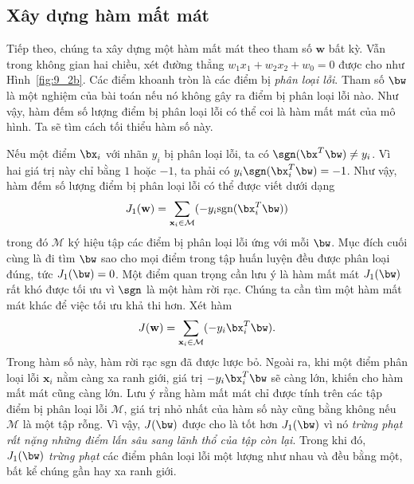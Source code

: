 
\subsection{Xây dựng hàm mất mát}
Tiếp theo, chúng ta xây dựng một hàm mất mát theo tham số $\mathbf{w}$ bất kỳ.
Vẫn trong không gian hai chiều, xét đường thẳng $w_1x_1 + w_2x_2 + w_0 = 0$ được
cho như Hình~\ref{fig:9_2b}. Các điểm khoanh tròn là các điểm bị \textit{phân
loại lỗi}. Tham số $\bw$ là một nghiệm của bài toán nếu nó không gây ra điểm bị phân loại lỗi nào. Như vậy, hàm đếm số lượng điểm bị phân loại lỗi có thể coi là hàm mất mát của mô hình. Ta sẽ tìm cách tối thiểu hàm số này.

Nếu một điểm $\bx_i$ với nhãn $y_i$ bị phân loại lỗi, ta có $\sgn(\bx^T\bw)
\neq y_i$. Vì hai giá trị này chỉ bằng $1$ hoặc $-1$, ta phải có
$y_i\sgn(\bx_i^T\bw) = -1$. Như vậy, hàm đếm số lượng điểm bị phân loại lỗi có
thể được viết dưới dạng
\begin{equation} 
    J_1(\mathbf{w}) = \sum_{\mathbf{x}_i \in \mathcal{M}} (-y_i\text{sgn}(\bx_i^T\bw)) 
\end{equation} 
trong đó $\mathcal{M}$ ký hiệu tập các điểm bị phân loại lỗi ứng với mỗi $\bw$. Mục đích cuối cùng là đi tìm $\bw$ sao cho mọi điểm trong tập huấn luyện đều được phân loại đúng, tức $J_1(\bw) = 0$. Một điểm quan trọng cần lưu ý là hàm mất mát $J_1(\bw)$ rất khó được tối ưu vì $\sgn$ là một hàm rời rạc. Chúng ta cần tìm một hàm mất mát khác để việc tối ưu khả thi hơn. 
Xét hàm 
\begin{equation} 
    J(\mathbf{w}) = \sum_{\mathbf{x}_i \in \mathcal{M}} (-y_i\bx_i^T\bw). 
\end{equation} 
Trong hàm số này, hàm rời rạc $\text{sgn}$ đã được lược bỏ. Ngoài ra, khi một
điểm phân loại lỗi $\mathbf{x}_i$ nằm càng xa ranh giới, giá trị
$-y_i\bx_i^T\bw$ sẽ càng lớn, khiến cho hàm mất mát cũng càng lớn. Lưu ý rằng
hàm mất mát chỉ được tính trên các tập điểm bị phân loại lỗi $\mathcal{M}$, giá
trị nhỏ nhất của hàm số này cũng bằng không nếu $\mathcal{M}$ là một tập rỗng.
Vì vậy, $J(\bw)$ được cho là tốt hơn $J_1(\bw)$ vì nó \textit{trừng phạt rất
nặng những điểm lấn sâu sang lãnh thổ của tập còn lại}. Trong khi đó,
$J_1(\bw)$ \textit{trừng phạt} các điểm phân loại lỗi một lượng như nhau và đều
bằng một, bất kể chúng gần hay xa ranh giới.

